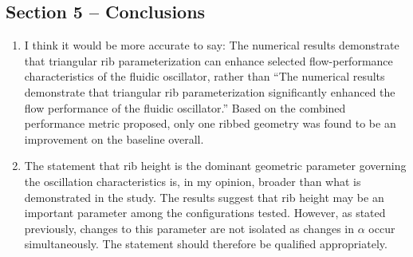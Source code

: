 \documentclass[11pt]{article}
\begin{document}
	\subsection*{Section 5 -- Conclusions}
	
	\begin{enumerate}
		\item I think it would be more accurate to say: The numerical results demonstrate that triangular rib parameterization can enhance selected flow-performance characteristics of the fluidic oscillator, rather than ``The numerical results demonstrate that triangular rib parameterization significantly enhanced the flow performance of the fluidic oscillator.'' Based on the combined performance metric proposed, only one ribbed geometry was found to be an improvement on the baseline overall.
		
		\item The statement that rib height is the dominant geometric parameter governing the oscillation characteristics is, in my opinion, broader than what is demonstrated in the study. The results suggest that rib height may be an important parameter among the configurations tested. However, as stated previously, changes to this parameter are not isolated as changes in $\alpha$ occur simultaneously. The statement should therefore be qualified appropriately.
	\end{enumerate}
	
\end{document}

